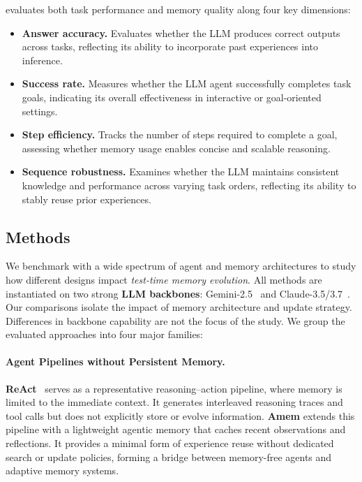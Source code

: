 \method evaluates both task performance and memory quality along four key dimensions: \begin{itemize}[itemsep=-0.2em, topsep=-0.3em, leftmargin=*] \item \textbf{Answer accuracy.} Evaluates whether the LLM produces correct outputs across tasks, reflecting its ability to incorporate past experiences into inference. \item \textbf{Success rate.} Measures whether the LLM agent successfully completes task goals, indicating its overall effectiveness in interactive or goal-oriented settings. \item \textbf{Step efficiency.} Tracks the number of steps required to complete a goal, assessing whether memory usage enables concise and scalable reasoning. \item \textbf{Sequence robustness.} Examines whether the LLM maintains consistent knowledge and performance across varying task orders, reflecting its ability to stably reuse prior experiences. \end{itemize}





\subsection{Methods}

We benchmark \method with a wide spectrum of agent and memory architectures to study how different designs impact \emph{test-time memory evolution}. All methods are instantiated on two strong \textbf{LLM backbones}: Gemini-2.5~\citep{comanici2025gemini} and Claude-3.5/3.7~\citep{anthropic_claude4_2025}. Our comparisons isolate the impact of memory architecture and update strategy. Differences in backbone capability are not the focus of the study. We group the evaluated approaches into four major families:

\paragraph{Agent Pipelines without Persistent Memory.}
\textbf{ReAct}~\citep{yao2023react} serves as a representative reasoning–action pipeline, where memory is limited to the immediate context. It generates interleaved reasoning traces and tool calls but does not explicitly store or evolve information.  
\textbf{Amem} extends this pipeline with a lightweight agentic memory that caches recent observations and reflections. It provides a minimal form of experience reuse without dedicated search or update policies, forming a bridge between memory-free agents and adaptive memory systems.

